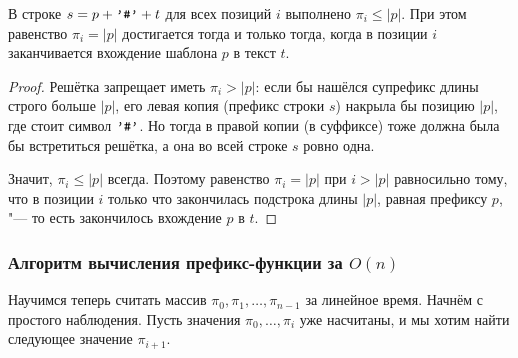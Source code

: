 \begin{center}
\end{center}

\begin{proposition}
    В строке $s = p + \text{\texttt{'\#'}} + t$ для всех позиций $i$ выполнено $\pi_i \le |p|$. При этом равенство $\pi_i = |p|$ достигается тогда и только тогда, когда в позиции $i$ заканчивается вхождение шаблона $p$ в текст $t$.
\end{proposition}

\begin{proof}
    Решётка запрещает иметь $\pi_i > |p|$: если бы нашёлся супрефикс длины строго больше $|p|$, его левая копия (префикс строки $s$) накрыла бы позицию $|p|$, где стоит символ $\text{\texttt{'\#'}}$. Но тогда в правой копии (в суффиксе) тоже должна была бы встретиться решётка, а она во всей строке $s$ ровно одна.

    Значит, $\pi_i \le |p|$ всегда. Поэтому равенство $\pi_i = |p|$ при $i > |p|$ равносильно тому, что в позиции $i$ только что закончилась подстрока длины $|p|$, равная префиксу $p$, "--- то есть закончилось вхождение $p$ в $t$.
\end{proof}

\subsubsection*{Алгоритм вычисления префикс-функции за $O(n)$}

Научимся теперь считать массив $\pi_0, \pi_1, \dots, \pi_{n-1}$ за линейное время. Начнём с простого наблюдения. Пусть значения $\pi_0, \dots, \pi_i$ уже насчитаны, и мы хотим найти следующее значение $\pi_{i+1}$.

